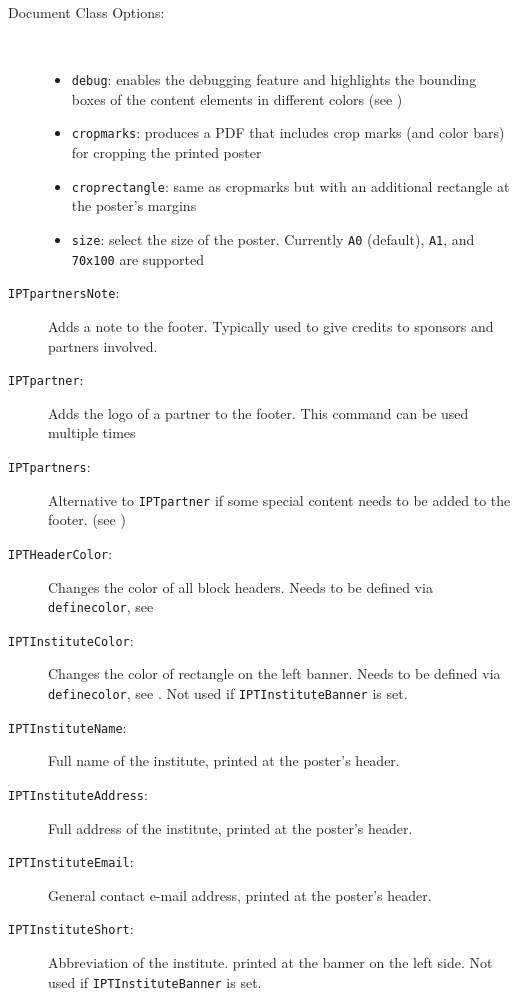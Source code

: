 \begin{description}
	\item[Document Class Options:]~
		\begin{itemize}
			\item \texttt{debug}: enables the debugging feature and highlights the bounding boxes of the content elements in different colors (see )
			\item \texttt{cropmarks}: produces a PDF that includes crop marks (and color bars) for cropping the printed poster
			\item \texttt{croprectangle}: same as cropmarks but with an additional rectangle at the poster's margins
			\item \texttt{size}: select the size of the poster. Currently \texttt{A0} (default), \texttt{A1}, and \texttt{70x100} are supported
		\end{itemize}
	\item[\texttt{IPTpartnersNote}:]
		Adds a note to the footer. Typically used to give credits to sponsors and partners involved.
	\item[\texttt{IPTpartner}:]
		Adds the logo of a partner to the footer. This command can be used multiple times
	\item[\texttt{IPTpartners}:]
		Alternative to \texttt{\bs{}IPTpartner} if some special content needs to be added to the footer. (see )
	
	\item[\texttt{IPTHeaderColor}:] Changes the color of all block headers. Needs to be defined via \texttt{\bs{}definecolor}, see 

	\item[\texttt{IPTInstituteColor}:] Changes the color of rectangle on the left banner. Needs to be defined via \texttt{\bs{}definecolor}, see . Not used if \texttt{IPTInstituteBanner} is set.

	\item[\texttt{IPTInstituteName}:] Full name of the institute, printed at the poster's header.

	\item[\texttt{IPTInstituteAddress}:] Full address of the institute, printed at the poster's header.

	\item[\texttt{IPTInstituteEmail}:] General contact e-mail address, printed at the poster's header.

	\item[\texttt{IPTInstituteShort}:] Abbreviation of the institute. printed at the banner on the left side. Not used if \texttt{IPTInstituteBanner} is set.


\end{description}
